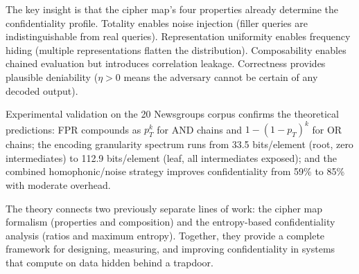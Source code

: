 \documentclass[11pt]{article}
\theoremstyle{definition}
\theoremstyle{plain}
\theoremstyle{remark}
\begin{document}
The key insight is that the cipher map's four properties already
determine the confidentiality profile.  Totality enables noise injection
(filler queries are indistinguishable from real queries).  Representation
uniformity enables frequency hiding (multiple representations flatten the
distribution).  Composability enables chained evaluation but introduces
correlation leakage.  Correctness provides plausible deniability
($\eta > 0$ means the adversary cannot be certain of any decoded output).

Experimental validation on the 20 Newsgroups corpus confirms the
theoretical predictions: FPR compounds as $p_T^k$ for AND chains and
$1 - (1 - p_T)^k$ for OR chains; the encoding granularity spectrum runs
from 33.5 bits/element (root, zero intermediates) to 112.9 bits/element
(leaf, all intermediates exposed); and the combined homophonic/noise
strategy improves confidentiality from 59\% to 85\% with moderate
overhead.

The theory connects two previously separate lines of work: the cipher map
formalism (properties and composition) and the entropy-based
confidentiality analysis (ratios and maximum entropy).  Together, they
provide a complete framework for designing, measuring, and improving
confidentiality in systems that compute on data hidden behind a trapdoor.




\end{document}

